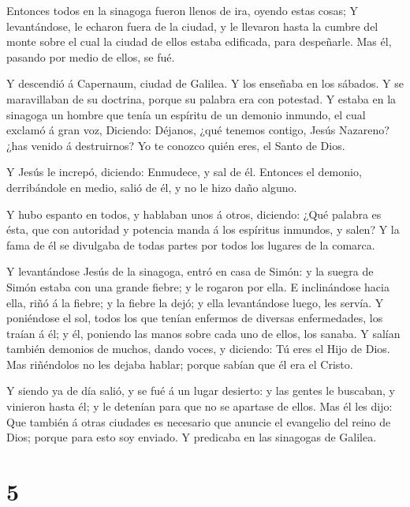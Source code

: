  Entonces todos en la sinagoga fueron llenos de ira, oyendo
estas cosas;  Y levantándose, le echaron fuera de la
ciudad, y le llevaron hasta la cumbre del monte sobre el cual la ciudad
de ellos estaba edificada, para despeñarle.  Mas él,
pasando por medio de ellos, se fué.

 Y descendió á Capernaum, ciudad de Galilea. Y los enseñaba
en los sábados.  Y se maravillaban de su doctrina, porque
su palabra era con potestad.  Y estaba en la sinagoga un
hombre que tenía un espíritu de un demonio inmundo, el cual exclamó á
gran voz,  Diciendo: Déjanos, ¿qué tenemos contigo, Jesús
Nazareno? ¿has venido á destruirnos? Yo te conozco quién eres, el Santo
de Dios.

 Y Jesús le increpó, diciendo: Enmudece, y sal de él.
Entonces el demonio, derribándole en medio, salió de él, y no le hizo
daño alguno.

 Y hubo espanto en todos, y hablaban unos á otros,
diciendo: ¿Qué palabra es ésta, que con autoridad y potencia manda á los
espíritus inmundos, y salen?  Y la fama de él se divulgaba
de todas partes por todos los lugares de la comarca.

 Y levantándose Jesús de la sinagoga, entró en casa de
Simón: y la suegra de Simón estaba con una grande fiebre; y le rogaron
por ella.  E inclinándose hacia ella, riñó á la fiebre; y
la fiebre la dejó; y ella levantándose luego, les servía. 
Y poniéndose el sol, todos los que tenían enfermos de diversas
enfermedades, los traían á él; y él, poniendo las manos sobre cada uno
de ellos, los sanaba.  Y salían también demonios de muchos,
dando voces, y diciendo: Tú eres el Hijo de Dios. Mas riñéndolos no les
dejaba hablar; porque sabían que él era el Cristo.

 Y siendo ya de día salió, y se fué á un lugar desierto: y
las gentes le buscaban, y vinieron hasta él; y le detenían para que no
se apartase de ellos.  Mas él les dijo: Que también á otras
ciudades es necesario que anuncie el evangelio del reino de Dios; porque
para esto soy enviado.  Y predicaba en las sinagogas de
Galilea.

\hypertarget{section-4}{%
\section{5}\label{section-4}}

